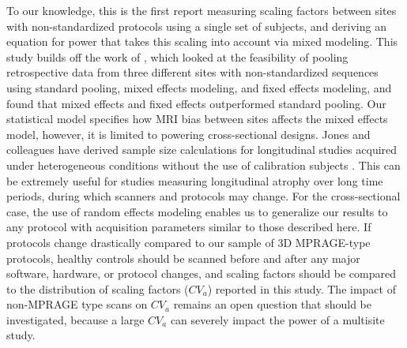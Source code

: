To our knowledge, this is the first report measuring scaling factors between sites with non-standardized protocols using a single set of subjects, and deriving an equation for power that takes this scaling into account via mixed modeling. This study builds off the work of \cite{fennema2007feasibility}, which looked at the feasibility of pooling retrospective data from three different sites with non-standardized sequences using standard pooling, mixed effects modeling, and fixed effects modeling, and found that mixed effects and fixed effects outperformed standard pooling. Our statistical model specifies how MRI bias between sites affects the mixed effects model, however, it is limited to powering cross-sectional designs. Jones and colleagues have derived sample size calculations for longitudinal studies acquired under heterogeneous conditions without the use of calibration subjects \cite{jones2013quantification}. This can be extremely useful for studies measuring longitudinal atrophy over long time periods, during which scanners and protocols may change. For the cross-sectional case, the use of random effects modeling enables us to generalize our results to any protocol with acquisition parameters similar to those described here. If protocols change drastically compared to our sample of 3D MPRAGE-type protocols, healthy controls should be scanned before and after any major software, hardware, or protocol changes, and scaling factors should be compared to the distribution of scaling factors ($CV_a$) reported in this study. The impact of non-MPRAGE type scans on $CV_a$ remains an open question that should be investigated, because a large $CV_a$ can severely impact the power of a multisite study.